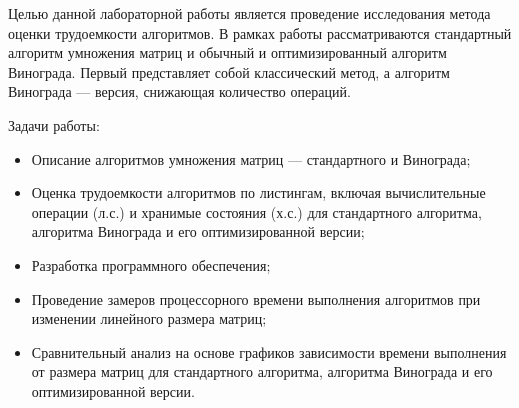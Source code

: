 
Целью данной лабораторной работы является проведение исследования метода оценки трудоемкости алгоритмов. В рамках работы рассматриваются стандартный алгоритм умножения матриц и обычный и оптимизированный алгоритм Винограда. Первый представляет собой классический метод, а алгоритм Винограда — версия, снижающая количество операций.

Задачи работы:
\begin{itemize}
    \item Описание алгоритмов умножения матриц — стандартного и Винограда;
    \item Оценка трудоемкости алгоритмов по листингам, включая вычислительные операции (л.с.) и хранимые состояния (х.с.) для стандартного алгоритма, алгоритма Винограда и его оптимизированной версии;
    \item Разработка программного обеспечения;
    \item Проведение замеров процессорного времени выполнения алгоритмов при изменении линейного размера матриц;
    \item Сравнительный анализ на основе графиков зависимости времени выполнения от размера матриц для стандартного алгоритма, алгоритма Винограда и его оптимизированной версии.
\end{itemize}


\clearpage
